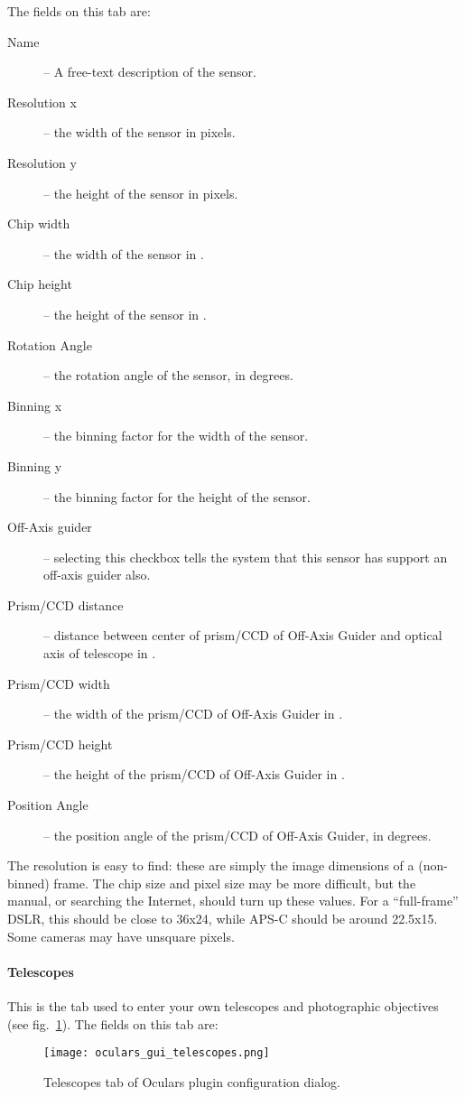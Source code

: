 The fields on this tab are:
\begin{description}
\item[Name] -- A free-text description of the sensor.
\item[Resolution x] -- the width of the sensor in pixels.
\item[Resolution y] -- the height of the sensor in pixels.
\item[Chip width] -- the width of the sensor in \mm.
\item[Chip height] -- the height of the sensor in \mm.
\item[Rotation Angle] -- the rotation angle of the sensor, in degrees.
\item[Binning x] -- the binning factor for the width of the sensor.
\item[Binning y] -- the binning factor for the height of the sensor.
\item[Off-Axis guider] -- selecting this checkbox tells the system that this sensor has support an off-axis guider also.
\item[Prism/CCD distance] -- distance between center of prism/CCD of Off-Axis Guider and optical axis of telescope in \mm.
\item[Prism/CCD width] -- the width of the prism/CCD of Off-Axis Guider in \mm.
\item[Prism/CCD height] -- the height of the prism/CCD of Off-Axis Guider in \mm.
\item[Position Angle] -- the position angle of the prism/CCD of Off-Axis Guider, in degrees.
\end{description}

\noindent The resolution is easy to find: these are simply the image dimensions of a (non-binned) frame. 
The chip size and pixel size may be more difficult, but the manual, or searching the Internet, should turn up these values.  
For a ``full-frame'' DSLR, this should be close to 36x24\mm, while APS-C should be around 22.5x15\mm. 
Some cameras may have unsquare pixels.

\paragraph{Telescopes}

This is the tab used to enter your own telescopes and photographic objectives (see fig.~\ref{fig:plugins:Oculars:Gui:Telescopes}). The fields on this tab are:

\begin{figure}[ht]\centering
\texttt{[image: oculars\_gui\_telescopes.png]}
\caption{Telescopes tab of Oculars plugin configuration dialog.}
\label{fig:plugins:Oculars:Gui:Telescopes}
\end{figure}


